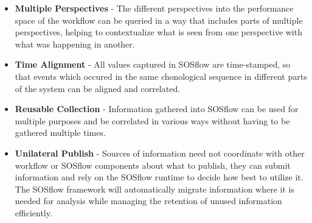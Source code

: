      \begin{itemize}
        \item \textbf{Multiple Perspectives} - The different
          perspectives into the performance space of the workflow can
          be queried in a way that includes parts of multiple
          perspectives, helping to contextualize what is seen from one
          perspective with what was happening in another.
        \item \textbf{Time Alignment} - All values captured in SOSflow
          are time-stamped, so that events which occured in the same
          chonological sequence in different parts of the system can be
          aligned and correlated.
        \item \textbf{Reusable Collection} - Information gathered into
          SOSflow can be used for multiple purposes and be correlated
          in various ways without having to be gathered multiple
          times.
        \item \textbf{Unilateral Publish} - Sources of information
          need not coordinate with other workflow or SOSflow
          components about what to publish, they can submit
          information and rely on the SOSflow runtime to decide
          how best to utilize it.
          The SOSflow framework will automatically migrate
          information where it is needed for analysis while managing
          the retention of unused information efficiently.
     \end{itemize}





